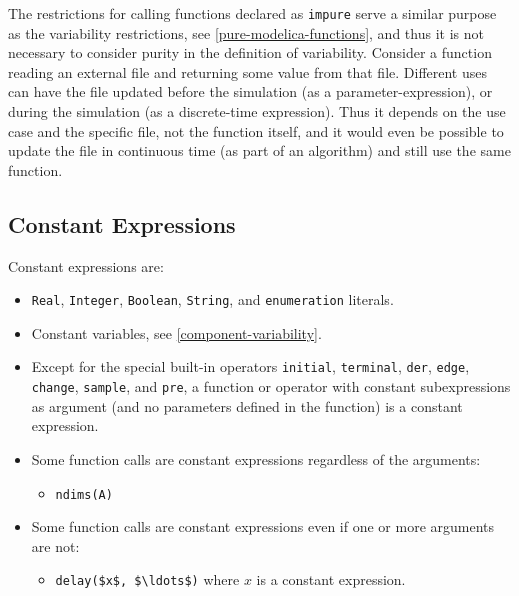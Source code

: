 \begin{nonnormative}
The restrictions for calling functions declared as \lstinline!impure! serve a similar purpose as the variability restrictions, see \cref{pure-modelica-functions}, and thus it is not necessary to consider purity in the definition of variability.
Consider a function reading an external file and returning some value from that file.
Different uses can have the file updated before the simulation (as a parameter-expression), or during the simulation (as a discrete-time expression).
Thus it depends on the use case and the specific file, not the function itself, and it would even be possible to update the file in continuous time (as part of an algorithm) and still use the same function.
\end{nonnormative}

\subsection{Constant Expressions}\label{constant-expressions}

Constant expressions are:
\begin{itemize}
\item
  \lstinline!Real!, \lstinline!Integer!, \lstinline!Boolean!, \lstinline!String!, and \lstinline!enumeration! literals.
\item
  Constant variables, see \cref{component-variability}.
\item
  Except for the special built-in operators \lstinline!initial!, \lstinline!terminal!, \lstinline!der!, \lstinline!edge!, \lstinline!change!, \lstinline!sample!, and \lstinline!pre!, a function or operator with constant subexpressions as argument (and no parameters defined in the function) is a constant expression.
\item
  Some function calls are constant expressions regardless of the arguments:
  \begin{itemize}
  \item
    \lstinline!ndims(A)!
  \end{itemize}
\item
  Some function calls are constant expressions even if one or more arguments are not:
  \begin{itemize}
  \item
    \lstinline!delay($x$, $\ldots$)! where $x$ is a constant expression.
  \end{itemize}
\end{itemize}

